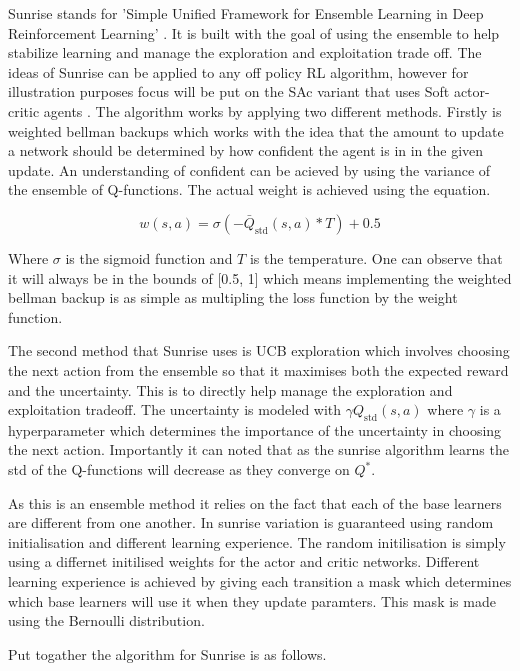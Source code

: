 Sunrise stands for 'Simple Unified Framework for Ensemble Learning in Deep Reinforcement Learning' \cite{leeSUNRISESimpleUnified2021}. It is built with the goal of using the ensemble to help stabilize learning and manage the exploration and exploitation trade off. The ideas of Sunrise can be applied to any off policy RL algorithm, however for illustration purposes focus will be put on the SAc variant that uses Soft actor-critic agents \cite{haarnojaSoftActorCriticOffPolicy2018}. The algorithm works by applying two different methods. Firstly is weighted bellman backups which works with the idea that the amount to update a network should be determined by how confident the agent is in in the given update. An understanding of confident can be acieved by using the variance of the ensemble of Q-functions. The actual weight is achieved using the equation.

\begin{equation}
	w(s,a)=\sigma (-\bar{Q}_{\text{std}}(s,a) * T) + 0.5
\end{equation}

\noindent Where $\sigma$ is the sigmoid function and $T$ is the temperature. One can observe that it will always be in the bounds of [0.5, 1] which means implementing the weighted bellman backup is as simple as multipling the loss function by the weight function.

The second method that Sunrise uses is UCB exploration which involves choosing the next action from the ensemble so that it maximises both the expected reward and the uncertainty. This is to directly help manage the exploration and exploitation tradeoff. The uncertainty is modeled with $\gamma Q_{\text{std}}(s, a)$ where $\gamma$ is a hyperparameter which determines the importance of the uncertainty in choosing the next action. Importantly it can noted that as the sunrise algorithm learns the std of the Q-functions will decrease as they converge on $Q^*$.

As this is an ensemble method it relies on the fact that each of the base learners are different from one another. In sunrise variation is guaranteed using random initialisation and different learning experience. The random initilisation is simply using a differnet initilised weights for the actor and critic networks. Different learning experience is achieved by giving each transition a mask which determines which base learners will use it when they update paramters. This mask is made using the Bernoulli distribution.

Put togather the algorithm for Sunrise is as follows.


